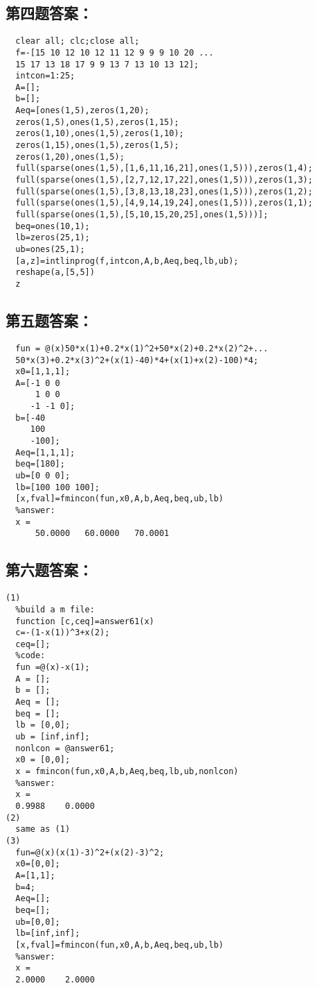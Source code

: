 \documentclass[oneside]{ctexbook}
\begin{document}
\subsection{第四题答案：}
\noindent 
\begin{lstlisting}
  clear all; clc;close all;
  f=-[15 10 12 10 12 11 12 9 9 9 10 20 ...
  15 17 13 18 17 9 9 13 7 13 10 13 12];
  intcon=1:25;
  A=[];
  b=[];
  Aeq=[ones(1,5),zeros(1,20);
  zeros(1,5),ones(1,5),zeros(1,15);
  zeros(1,10),ones(1,5),zeros(1,10);
  zeros(1,15),ones(1,5),zeros(1,5);
  zeros(1,20),ones(1,5);
  full(sparse(ones(1,5),[1,6,11,16,21],ones(1,5))),zeros(1,4);
  full(sparse(ones(1,5),[2,7,12,17,22],ones(1,5))),zeros(1,3);
  full(sparse(ones(1,5),[3,8,13,18,23],ones(1,5))),zeros(1,2);
  full(sparse(ones(1,5),[4,9,14,19,24],ones(1,5))),zeros(1,1);
  full(sparse(ones(1,5),[5,10,15,20,25],ones(1,5)))];
  beq=ones(10,1);
  lb=zeros(25,1);
  ub=ones(25,1);
  [a,z]=intlinprog(f,intcon,A,b,Aeq,beq,lb,ub);
  reshape(a,[5,5])
  z
\end{lstlisting}
\subsection{第五题答案：}
\noindent 
\begin{lstlisting}
  fun = @(x)50*x(1)+0.2*x(1)^2+50*x(2)+0.2*x(2)^2+...
  50*x(3)+0.2*x(3)^2+(x(1)-40)*4+(x(1)+x(2)-100)*4;
  x0=[1,1,1];
  A=[-1 0 0
      1 0 0
     -1 -1 0];
  b=[-40
     100
     -100];
  Aeq=[1,1,1];
  beq=[180];
  ub=[0 0 0];
  lb=[100 100 100];
  [x,fval]=fmincon(fun,x0,A,b,Aeq,beq,ub,lb)
  %answer:
  x =
      50.0000   60.0000   70.0001
\end{lstlisting}
\subsection{第六题答案：}
\noindent 
\begin{lstlisting}
(1)
  %build a m file:
  function [c,ceq]=answer61(x)
  c=-(1-x(1))^3+x(2);
  ceq=[];
  %code:
  fun =@(x)-x(1);
  A = [];
  b = [];
  Aeq = [];
  beq = [];
  lb = [0,0];
  ub = [inf,inf];
  nonlcon = @answer61;
  x0 = [0,0];
  x = fmincon(fun,x0,A,b,Aeq,beq,lb,ub,nonlcon)
  %answer:
  x =
  0.9988    0.0000
(2)
  same as (1)
(3)
  fun=@(x)(x(1)-3)^2+(x(2)-3)^2;
  x0=[0,0];
  A=[1,1];
  b=4;
  Aeq=[];
  beq=[];
  ub=[0,0];
  lb=[inf,inf];
  [x,fval]=fmincon(fun,x0,A,b,Aeq,beq,ub,lb)
  %answer:
  x =
  2.0000    2.0000
\end{lstlisting}
\end{document}
